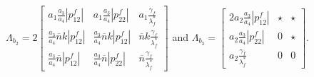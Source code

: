 $
        \Lambda_{b_2} = 2 
        \left[ \begin{smallmatrix} 
            a_1 \tfrac{a_3}{a_4} |p_{12}^f|   &  a_1 \tfrac{a_3}{a_4} |p_{22}^f| & a_1 \tfrac{\gamma_f}{\lambda_f^*} \\
            \tfrac{a_3}{a_4} \overline{n} k |p_{12}^f| & \tfrac{a_3}{a_4} \overline{n} k |p_{12}^f|& \overline{n} k \tfrac{\gamma_f}{\lambda_f^*} \\
            \tfrac{a_3}{a_4}\overline{n} |p_{12}^f|   &  \tfrac{a_3}{a_4} \overline{n}|p_{22}^f| & \overline{n}\tfrac{\gamma_f}{\lambda_f^*}
        \end{smallmatrix} \right]$ 
        and
        $\Lambda_{b_3}=
        \left[ \begin{smallmatrix} 
            2  a_2 \tfrac{a_3}{a_4} |p_{12}^f| & \star & \star \\
            a_2 \tfrac{a_3}{a_4} |p_{22}^f|   &     0      &                \star              \\
            a_2 \tfrac{\gamma_f}{\lambda_f^*} & 0 &        0              
        \end{smallmatrix} \right].$
